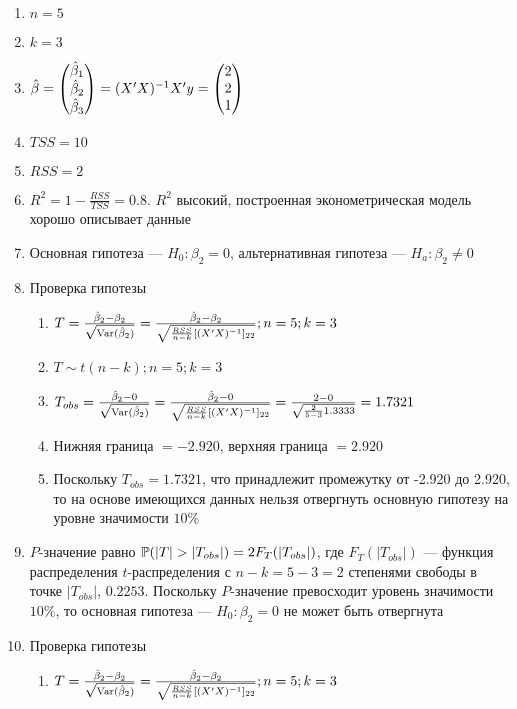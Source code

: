 \begin{problem}
\begin{sol}
\begin{enumerate}
\item $n = 5$
\item $k = 3$
\item $\hat{\beta} = \begin{pmatrix} \hat{\beta}_1 \\ \hat{\beta}_2 \\ \hat{\beta}_3 \end{pmatrix} = (X'X)^{-1}X'y = \begin{pmatrix} 2 \\ 2 \\ 1 \end{pmatrix}$
\item $TSS = 10$
\item $RSS = 2$
\item $R^2 = 1 - \frac {RSS}{TSS} = 0.8.$ $R^2$ высокий, построенная эконометрическая модель хорошо описывает данные
\item Основная гипотеза — $H_0: \beta_2 = 0$, альтернативная гипотеза — $H_a: \beta_2 \not= 0$
\item Проверка гипотезы
\begin{enumerate}
\item $T = \frac{\hat{\beta}_2 - \beta_2}{\sqrt{\operatorname{Var}(\hat{\beta}_2)}} = \frac {\hat{\beta}_2 - \beta_2}{\sqrt{{\frac{RSS}{n-k}}[(X'X)^{-1}]_{22}}}; n = 5; k = 3$
\item $T \sim t(n-k); n = 5; k = 3$
\item $T_{obs} = \frac{\hat{\beta}_2 - 0}{\sqrt{\operatorname{Var}(\hat{\beta}_2)}} = \frac {\hat{\beta}_2 - 0}{\sqrt{{\frac{RSS}{n-k}}[(X'X)^{-1}]_{22}}} = \frac{2-0}{\sqrt{{\frac{2}{5-3}}1.3333}} = 1.7321$
\item Нижняя граница $= -2.920$, верхняя граница $= 2.920$
\item Поскольку $T_{obs} = 1.7321$, что принадлежит промежутку от -2.920 до 2.920, то на основе имеющихся данных нельзя отвергнуть основную гипотезу на уровне значимости $10\%$
\end{enumerate}
\item $P$-значение равно $\P (|T|>|T_{obs}|) = 2F_{T}(|T_{obs}|)$, где $F_{T}(|T_{obs}|)$ — функция распределения $t$-распределения с $n - k = 5 - 3 = 2$ степенями свободы в точке $|T_{obs}|$, $0.2253$. Поскольку $P$-значение превосходит уровень значимости $10\%$, то основная гипотеза — $H_0: \beta_2 = 0$ не может быть отвергнута
\item Проверка гипотезы
\begin{enumerate}
\item $T = \frac{\hat{\beta}_2 - \beta_2}{\sqrt{\operatorname{Var}(\hat{\beta}_2)}} = \frac {\hat{\beta}_2 - \beta_2}{\sqrt{{\frac{RSS}{n-k}}[(X'X)^{-1}]_{22}}}; n = 5; k = 3$

\end{enumerate}
\end{enumerate}
\end{sol}
\end{problem}
